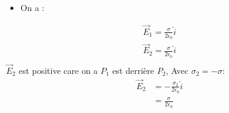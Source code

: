 \documentclass[12pt]{article}
\begin{document}
\begin{correctionbox}
	\begin{itemize}
		\item On a :
	\end{itemize}
	\begin{align*}
		\vec{E}_1 = \frac{\sigma}{2\epsilon_0} \hat{i} \\
		\vec{E}_2 = \frac{\sigma}{2\epsilon_0} \hat{i} \\
	\end{align*}
	\noindent $\vec{E}_2$ est positive care on a $P_1$ est derrière $P_2$, Avec $\sigma_2 = - \sigma$:
	\begin{align*}
		\vec{E}_2 & = - \frac{\sigma_2}{2\epsilon_0} \hat{i} \\
		          & = \frac{\sigma}{2\epsilon_0}
	\end{align*}

\end{correctionbox}
\end{document}
